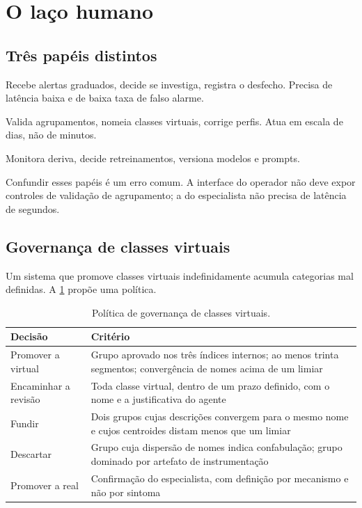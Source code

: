 \section{O laço humano}

\subsection{Três papéis distintos}

\begin{description}[leftmargin=0pt,style=nextline,itemsep=0.4em]

\item[Operador de turno.] Recebe alertas graduados, decide se investiga, registra o
desfecho. Precisa de latência baixa e de baixa taxa de falso alarme.

\item[Especialista de disciplina.] Valida agrupamentos, nomeia classes virtuais, corrige
perfis. Atua em escala de dias, não de minutos.

\item[Responsável pelo modelo.] Monitora deriva, decide retreinamentos, versiona
modelos e prompts.

\end{description}

Confundir esses papéis é um erro comum. A interface do operador não deve expor controles
de validação de agrupamento; a do especialista não precisa de latência de segundos.

\subsection{Governança de classes virtuais}

Um sistema que promove classes virtuais indefinidamente acumula categorias mal definidas.
A \cref{tab:oper-governanca} propõe uma política.

\begin{table}[htbp]
\centering
\caption{Política de governança de classes virtuais.}
\label{tab:oper-governanca}
\small
\begin{tabular}{p{3.2cm}p{8.8cm}}
\toprule
\textbf{Decisão} & \textbf{Critério} \\
\midrule
Promover a virtual &
Grupo aprovado nos três índices internos; ao menos trinta segmentos; convergência de
nomes acima de um limiar \\
\addlinespace
Encaminhar a revisão &
Toda classe virtual, dentro de um prazo definido, com o nome e a justificativa do
agente \\
\addlinespace
Fundir &
Dois grupos cujas descrições convergem para o mesmo nome e cujos centroides distam menos
que um limiar \\
\addlinespace
Descartar &
Grupo cuja dispersão de nomes indica confabulação; grupo dominado por artefato de
instrumentação \\
\addlinespace
Promover a real &
Confirmação do especialista, com definição por mecanismo e não por sintoma \\
\bottomrule
\end{tabular}
\end{table}

